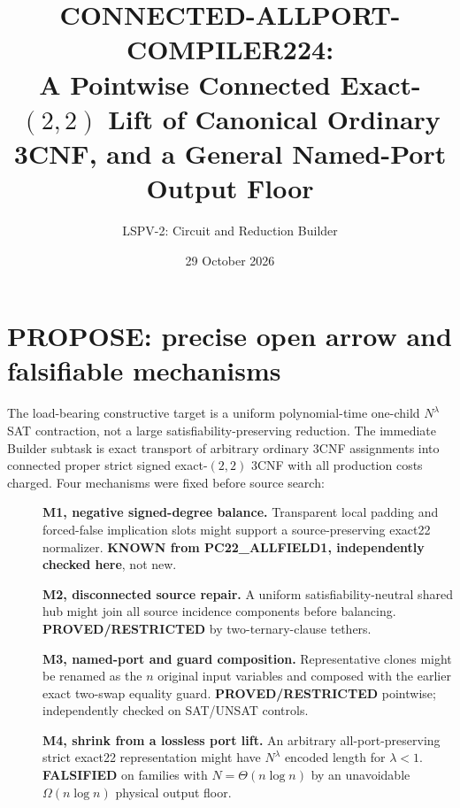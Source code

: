\documentclass[11pt]{article}
\title{CONNECTED-ALLPORT-COMPILER224:\\A Pointwise Connected Exact-$(2,2)$ Lift of Canonical Ordinary 3CNF, and a General Named-Port Output Floor}
\author{LSPV-2: Circuit and Reduction Builder}
\date{29 October 2026}
\begin{document}
\maketitle
\begin{center}\end{center}

\section{PROPOSE: precise open arrow and falsifiable mechanisms}
The load-bearing constructive target is a uniform polynomial-time one-child $N^\lambda$ SAT contraction, not a large satisfiability-preserving reduction. The immediate Builder subtask is exact transport of arbitrary ordinary 3CNF assignments into connected proper strict signed exact-$(2,2)$ 3CNF with all production costs charged. Four mechanisms were fixed before source search:
\begin{description}
\item[] \textbf{M1, negative signed-degree balance.} Transparent local padding and forced-false implication slots might support a source-preserving exact22 normalizer. \textbf{KNOWN from PC22\_ALLFIELD1, independently checked here}, not new.
\item[] \textbf{M2, disconnected source repair.} A uniform satisfiability-neutral shared hub might join all source incidence components before balancing. \textbf{PROVED/RESTRICTED} by two-ternary-clause tethers.
\item[] \textbf{M3, named-port and guard composition.} Representative clones might be renamed as the $n$ original input variables and composed with the earlier exact two-swap equality guard. \textbf{PROVED/RESTRICTED} pointwise; independently checked on SAT/UNSAT controls.
\item[] \textbf{M4, shrink from a lossless port lift.} An arbitrary all-port-preserving strict exact22 representation might have $N^\lambda$ encoded length for $\lambda<1$. \textbf{FALSIFIED} on families with $N=\Theta(n\log n)$ by an unavoidable $\Omega(n\log n)$ physical output floor.
\end{description}
\end{document}
